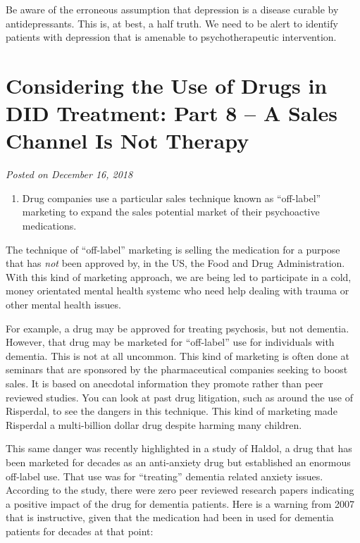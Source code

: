 \documentclass[]{book}
\providecommand{\tightlist}{%
  \setlength{\itemsep}{0pt}\setlength{\parskip}{0pt}}
\begin{document}
Be aware of the erroneous assumption that depression is a disease curable by antidepressants. This is, at best, a half truth. We need to be alert to identify patients with depression that is amenable to psychotherapeutic intervention.

\hypertarget{considering-the-use-of-drugs-in-did-treatment-part-8-a-sales-channel-is-not-therapy}{%
\section{Considering the Use of Drugs in DID Treatment: Part 8 -- A Sales Channel Is Not Therapy}\label{considering-the-use-of-drugs-in-did-treatment-part-8-a-sales-channel-is-not-therapy}}

\emph{Posted on December 16, 2018}

\begin{enumerate}
\def\labelenumi{\arabic{enumi}.}
\setcounter{enumi}{7}
\tightlist
\item
  Drug companies use a particular sales technique known as ``off-label'' marketing to expand the sales potential market of their psychoactive medications.
\end{enumerate}

The technique of ``off-label'' marketing is selling the medication for a purpose that has \emph{not} been approved by, in the US, the Food and Drug Administration. With this kind of marketing approach, we are being led to participate in a cold, money orientated mental health systemc who need help dealing with trauma or other mental health issues.

For example, a drug may be approved for treating psychosis, but not dementia. However, that drug may be marketed for ``off-label'' use for individuals with dementia. This is not at all uncommon. This kind of marketing is often done at seminars that are sponsored by the pharmaceutical companies seeking to boost sales. It is based on anecdotal information they promote rather than peer reviewed studies. You can look at past drug litigation, such as around the use of Risperdal, to see the dangers in this technique. This kind of marketing made Risperdal a multi-billion dollar drug despite harming many children.

This same danger was recently highlighted in a study of Haldol, a drug that has been marketed for decades as an anti-anxiety drug but established an enormous off-label use. That use was for ``treating'' dementia related anxiety issues. According to the study, there were zero peer reviewed research papers indicating a positive impact of the drug for dementia patients. Here is a warning from 2007 that is instructive, given that the medication had been in used for dementia patients for decades at that point:
\end{document}
